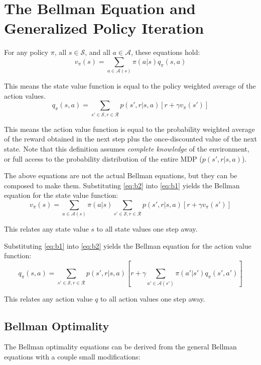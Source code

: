 \documentclass{article}
\begin{document}
\section{The Bellman Equation and Generalized Policy Iteration}
For any policy $\pi$, all $s \in \mathcal{S}$, and all $a \in \mathcal{A}$, these equations hold:
\begin{equation}
  v_\pi(s) = \sum_{a \in \mathcal{A}(s)} \pi(a|s) q_\pi(s,a) \label{eq:b1}
\end{equation}

This means the state value function is equal to the policy weighted average of the action values.
\begin{equation}
  q_\pi(s,a) = \sum_{s' \in \mathcal{S}, r \in \mathcal{R}} p(s',r|s,a)[r + \gamma v_\pi(s')] \label{eq:b2}
\end{equation}

This means the action value function is equal to the probability weighted average of the reward obtained in the next step
plus the once-discounted value of the next state. Note that this definition assumes \emph{complete knowledge} of the environment, or 
full access to the probability distribution of the entire MDP ($p(s',r|s,a)$). 

The above equations are not the actual Bellman equations, but they can be composed to make them. Substituting \eqref{eq:b2} 
into \eqref{eq:b1} yields the Bellman equation for the state value function:
\begin{equation}
  v_\pi(s) = \sum_{a \in \mathcal{A}(s)} \pi(a|s) \sum_{s' \in \mathcal{S}, r \in \mathcal{R}} p(s',r|s,a)[r + \gamma v_\pi(s')]
\end{equation}

This relates any state value $s$ to all state values one step away.

Substituting \eqref{eq:b1} into \eqref{eq:b2} yields the Bellman equation for the action value function:
\begin{equation}
  q_\pi(s,a) = \sum_{s' \in \mathcal{S}, r \in \mathcal{R}} p(s',r|s,a)[r + \gamma \sum_{a' \in \mathcal{A}(s')} \pi(a'|s') q_\pi(s',a')]
\end{equation}

This relates any action value $q$ to all action values one step away.

\subsection{Bellman Optimality}
The Bellman optimality equations can be derived from the general Bellman equations with a couple small modifications:
\end{document}
